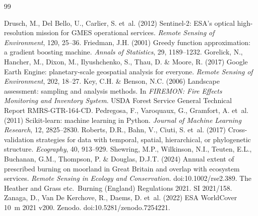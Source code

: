 \documentclass[11pt,a4paper]{article}
\begin{document}
\begin{thebibliography}{99}
 Drusch, M., Del Bello, U., Carlier, S. et~al. (2012) Sentinel-2: ESA's optical high-resolution mission for GMES operational services. \emph{Remote Sensing of Environment}, 120, 25--36.
 Friedman, J.H. (2001) Greedy function approximation: a gradient boosting machine. \emph{Annals of Statistics}, 29, 1189--1232.
 Gorelick, N., Hancher, M., Dixon, M., Ilyushchenko, S., Thau, D. \& Moore, R. (2017) Google Earth Engine: planetary-scale geospatial analysis for everyone. \emph{Remote Sensing of Environment}, 202, 18--27.
 Key, C.H. \& Benson, N.C. (2006) Landscape assessment: sampling and analysis methods. In \emph{FIREMON: Fire Effects Monitoring and Inventory System}. USDA Forest Service General Technical Report RMRS-GTR-164-CD.
 Pedregosa, F., Varoquaux, G., Gramfort, A. et~al. (2011) Scikit-learn: machine learning in Python. \emph{Journal of Machine Learning Research}, 12, 2825--2830.
 Roberts, D.R., Bahn, V., Ciuti, S. et~al. (2017) Cross-validation strategies for data with temporal, spatial, hierarchical, or phylogenetic structure. \emph{Ecography}, 40, 913--929.
 Shewring, M.P., Wilkinson, N.I., Teuten, E.L., Buchanan, G.M., Thompson, P. \& Douglas, D.J.T. (2024) Annual extent of prescribed burning on moorland in Great Britain and overlap with ecosystem services. \emph{Remote Sensing in Ecology and Conservation}. doi:10.1002/rse2.389.
 The Heather and Grass etc.\ Burning (England) Regulations 2021. SI 2021/158.
 Zanaga, D., Van De Kerchove, R., Daems, D. et~al. (2022) ESA WorldCover 10~m 2021 v200. Zenodo. doi:10.5281/zenodo.7254221.
\end{thebibliography}

\clearpage
\appendix
{}
\renewcommand{\thesection}{\Alph{section}}
\end{document}
